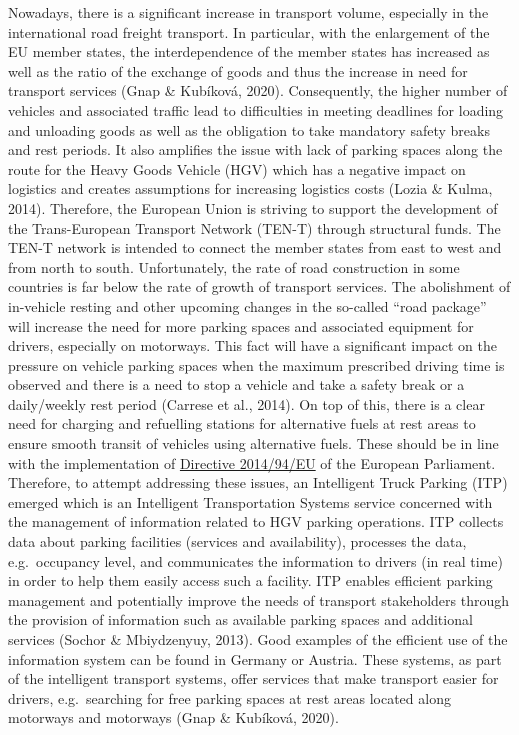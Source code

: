 \documentclass[
]{book}
\begin{document}
Nowadays, there is a significant increase in transport volume, especially in the international road freight transport. In particular, with the enlargement of the EU member states, the interdependence of the member states has increased as well as the ratio of the exchange of goods and thus the increase in need for transport services (Gnap \& Kubíková, 2020). Consequently, the higher number of vehicles and associated traffic lead to difficulties in meeting deadlines for loading and unloading goods as well as the obligation to take mandatory safety breaks and rest periods. It also amplifies the issue with lack of parking spaces along the route for the Heavy Goods Vehicle (HGV) which has a negative impact on logistics and creates assumptions for increasing logistics costs (Lozia \& Kulma, 2014).
Therefore, the European Union is striving to support the development of the Trans-European Transport Network (TEN-T) through structural funds. The TEN-T network is intended to connect the member states from east to west and from north to south. Unfortunately, the rate of road construction in some countries is far below the rate of growth of transport services. The abolishment of in-vehicle resting and other upcoming changes in the so-called ``road package'' will increase the need for more parking spaces and associated equipment for drivers, especially on motorways. This fact will have a significant impact on the pressure on vehicle parking spaces when the maximum prescribed driving time is observed and there is a need to stop a vehicle and take a safety break or a daily/weekly rest period (Carrese et al., 2014). On top of this, there is a clear need for charging and refuelling stations for alternative fuels at rest areas to ensure smooth transit of vehicles using alternative fuels. These should be in line with the implementation of \href{https://eur-lex.europa.eu/legal-content/en/TXT/?uri=CELEX\%3A32014L0094}{Directive 2014/94/EU} of the European Parliament.
Therefore, to attempt addressing these issues, an Intelligent Truck Parking (ITP) emerged which is an Intelligent Transportation Systems service concerned with the management of information related to HGV parking operations. ITP collects data about parking facilities (services and availability), processes the data, e.g.~occupancy level, and communicates the information to drivers (in real time) in order to help them easily access such a facility. ITP enables efficient parking management and potentially improve the needs of transport stakeholders through the provision of information such as available parking spaces and additional services (Sochor \& Mbiydzenyuy, 2013).
Good examples of the efficient use of the information system can be found in Germany or Austria. These systems, as part of the intelligent transport systems, offer services that make transport easier for drivers, e.g.~searching for free parking spaces at rest areas located along motorways and motorways (Gnap \& Kubíková, 2020).
\end{document}
